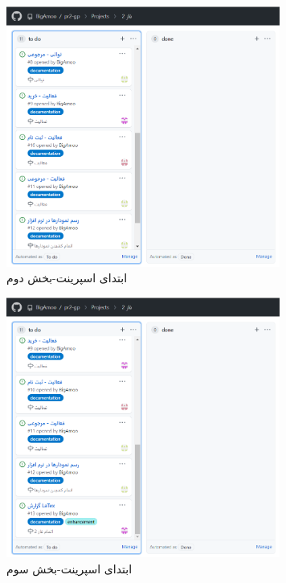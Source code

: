 \documentclass[12pt,a4paper]{article}
\begin{document}
	\begin{figure}[h!]
		\begin{center}
			\includegraphics[width=9cm]{images/screenshot_2.png}
		\end{center}
		\caption{ابتدای اسپرینت-بخش دوم}
	\end{figure}
		\begin{figure}[h!]
		\begin{center}
			\includegraphics[width=9cm]{images/screenshot_3.png}	
		\end{center}
		\caption{ابتدای اسپرینت-بخش سوم}
	\end{figure}
	
\end{document}
